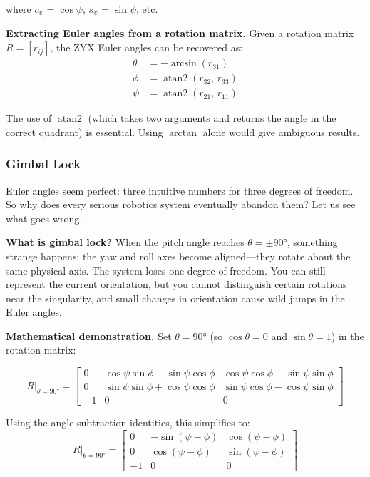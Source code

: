 where $c_\psi = \cos\psi$, $s_\psi = \sin\psi$, etc.

\textbf{Extracting Euler angles from a rotation matrix.} Given a rotation matrix $R = [r_{ij}]$, the ZYX Euler angles can be recovered as:
\begin{align}
\theta &= -\arcsin(r_{31}) \\
\phi &= \operatorname{atan2}(r_{32}, \, r_{33}) \\
\psi &= \operatorname{atan2}(r_{21}, \, r_{11})
\end{align}

The use of $\operatorname{atan2}$ (which takes two arguments and returns the angle in the correct quadrant) is essential. Using $\arctan$ alone would give ambiguous results.

\subsubsection{Gimbal Lock}

Euler angles seem perfect: three intuitive numbers for three degrees of freedom. So why does every serious robotics system eventually abandon them? Let us see what goes wrong.

\textbf{What is gimbal lock?} When the pitch angle reaches $\theta = \pm 90°$, something strange happens: the yaw and roll axes become aligned---they rotate about the same physical axis. The system loses one degree of freedom. You can still represent the current orientation, but you cannot distinguish certain rotations near the singularity, and small changes in orientation cause wild jumps in the Euler angles.

\textbf{Mathematical demonstration.} Set $\theta = 90°$ (so $\cos\theta = 0$ and $\sin\theta = 1$) in the rotation matrix:

\begin{equation}
R\big|_{\theta=90°} = \begin{bmatrix}
0 & \cos\psi \sin\phi - \sin\psi \cos\phi & \cos\psi \cos\phi + \sin\psi \sin\phi \\
0 & \sin\psi \sin\phi + \cos\psi \cos\phi & \sin\psi \cos\phi - \cos\psi \sin\phi \\
-1 & 0 & 0
\end{bmatrix}
\end{equation}

Using the angle subtraction identities, this simplifies to:
\begin{equation}
R\big|_{\theta=90°} = \begin{bmatrix}
0 & -\sin(\psi - \phi) & \cos(\psi - \phi) \\
0 & \cos(\psi - \phi) & \sin(\psi - \phi) \\
-1 & 0 & 0
\end{bmatrix}
\end{equation}

